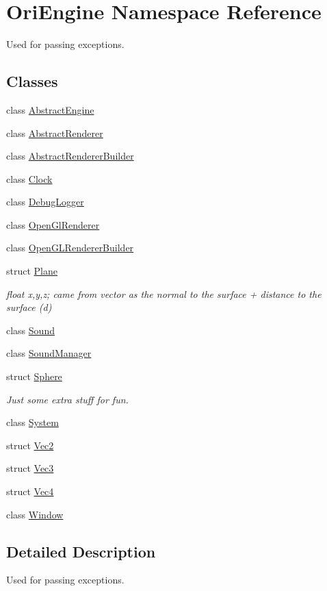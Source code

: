 \hypertarget{namespace_ori_engine}{}\section{Ori\+Engine Namespace Reference}
\label{namespace_ori_engine}


Used for passing exceptions.  


\subsection*{Classes}
\begin{DoxyCompactItemize}
\item 
class \hyperlink{class_ori_engine_1_1_abstract_engine}{Abstract\+Engine}
\item 
class \hyperlink{class_ori_engine_1_1_abstract_renderer}{Abstract\+Renderer}
\item 
class \hyperlink{class_ori_engine_1_1_abstract_renderer_builder}{Abstract\+Renderer\+Builder}
\item 
class \hyperlink{class_ori_engine_1_1_clock}{Clock}
\item 
class \hyperlink{class_ori_engine_1_1_debug_logger}{Debug\+Logger}
\item 
class \hyperlink{class_ori_engine_1_1_open_gl_renderer}{Open\+Gl\+Renderer}
\item 
class \hyperlink{class_ori_engine_1_1_open_g_l_renderer_builder}{Open\+G\+L\+Renderer\+Builder}
\item 
struct \hyperlink{struct_ori_engine_1_1_plane}{Plane}
\begin{DoxyCompactList}\small\item\em float x,y,z; came from vector as the normal to the surface + distance to the surface (d) \end{DoxyCompactList}\item 
class \hyperlink{class_ori_engine_1_1_sound}{Sound}
\item 
class \hyperlink{class_ori_engine_1_1_sound_manager}{Sound\+Manager}
\item 
struct \hyperlink{struct_ori_engine_1_1_sphere}{Sphere}
\begin{DoxyCompactList}\small\item\em Just some extra stuff for fun. \end{DoxyCompactList}\item 
class \hyperlink{class_ori_engine_1_1_system}{System}
\item 
struct \hyperlink{struct_ori_engine_1_1_vec2}{Vec2}
\item 
struct \hyperlink{struct_ori_engine_1_1_vec3}{Vec3}
\item 
struct \hyperlink{struct_ori_engine_1_1_vec4}{Vec4}
\item 
class \hyperlink{class_ori_engine_1_1_window}{Window}
\end{DoxyCompactItemize}


\subsection{Detailed Description}
Used for passing exceptions. 